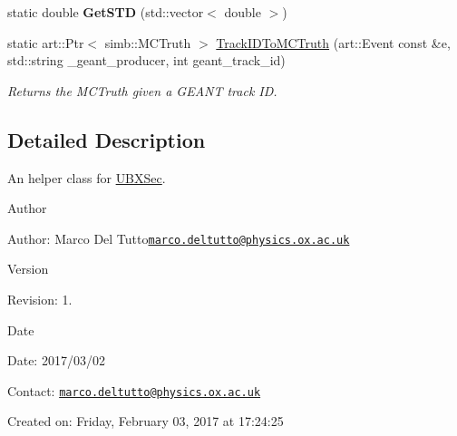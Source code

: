 \begin{DoxyCompactItemize}
\item 
\hypertarget{classUBXSecHelper_aea63fece97a7aaefb3956eb312a844a0}{static double {\bfseries Get\-S\-T\-D} (std\-::vector$<$ double $>$)}\label{classUBXSecHelper_aea63fece97a7aaefb3956eb312a844a0}

\item 
static art\-::\-Ptr$<$ simb\-::\-M\-C\-Truth $>$ \hyperlink{classUBXSecHelper_a3ab95e69a7b94a8b50de724e2f04f69e}{Track\-I\-D\-To\-M\-C\-Truth} (art\-::\-Event const \&e, std\-::string \-\_\-geant\-\_\-producer, int geant\-\_\-track\-\_\-id)
\begin{DoxyCompactList}\small\item\em Returns the M\-C\-Truth given a G\-E\-A\-N\-T track I\-D. \end{DoxyCompactList}\end{DoxyCompactItemize}


\subsection{Detailed Description}
An helper class for \hyperlink{classUBXSec}{U\-B\-X\-Sec}. 

\begin{DoxyAuthor}{Author}

\end{DoxyAuthor}
\begin{DoxyParagraph}{Author\-:}
Marco Del Tutto\href{mailto:marco.deltutto@physics.ox.ac.uk}{\tt marco.\-deltutto@physics.\-ox.\-ac.\-uk} 
\end{DoxyParagraph}


\begin{DoxyVersion}{Version}

\end{DoxyVersion}
\begin{DoxyParagraph}{Revision\-:}
1. 
\end{DoxyParagraph}


\begin{DoxyDate}{Date}

\end{DoxyDate}
\begin{DoxyParagraph}{Date\-:}
2017/03/02 
\end{DoxyParagraph}


Contact\-: \href{mailto:marco.deltutto@physics.ox.ac.uk}{\tt marco.\-deltutto@physics.\-ox.\-ac.\-uk}

Created on\-: Friday, February 03, 2017 at 17\-:24\-:25 


